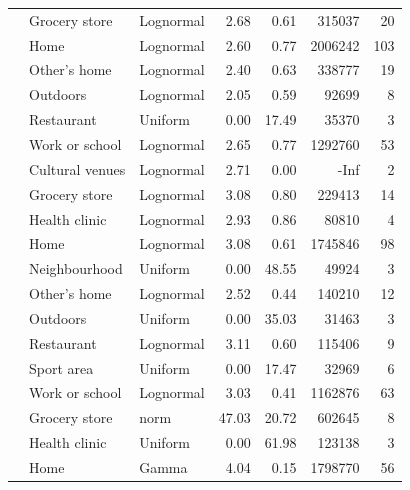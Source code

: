 \documentclass[preprint, 3p,
authoryear]{elsarticle} %
\begin{document}
\begin{table}
{\begin{threeparttable}
\begin{tabular}[t]{rllrrrr}
 & Grocery store & Lognormal & 2.68 & 0.61 & 315037 & 20\\

 & Home & Lognormal & 2.60 & 0.77 & 2006242 & 103\\

 & Other's home & Lognormal & 2.40 & 0.63 & 338777 & 19\\

 & Outdoors & Lognormal & 2.05 & 0.59 & 92699 & 8\\

 & Restaurant & Uniform & 0.00 & 17.49 & 35370 & 3\\

\multirow[t]{-7}{*}{\raggedleft\arraybackslash 2010} & Work or school & Lognormal & 2.65 & 0.77 & 1292760 & 53\\
\cmidrule{1-7}
 & Cultural venues & Lognormal & 2.71 & 0.00 & -Inf & 2\\

 & Grocery store & Lognormal & 3.08 & 0.80 & 229413 & 14\\

 & Health clinic & Lognormal & 2.93 & 0.86 & 80810 & 4\\

 & Home & Lognormal & 3.08 & 0.61 & 1745846 & 98\\

 & Neighbourhood & Uniform & 0.00 & 48.55 & 49924 & 3\\

 & Other's home & Lognormal & 2.52 & 0.44 & 140210 & 12\\

 & Outdoors & Uniform & 0.00 & 35.03 & 31463 & 3\\

 & Restaurant & Lognormal & 3.11 & 0.60 & 115406 & 9\\

 & Sport area & Uniform & 0.00 & 17.47 & 32969 & 6\\

\multirow[t]{-10}{*}{\raggedleft\arraybackslash 2015} & Work or school & Lognormal & 3.03 & 0.41 & 1162876 & 63\\
\cmidrule{1-7}
 & Grocery store & norm & 47.03 & 20.72 & 602645 & 8\\

 & Health clinic & Uniform & 0.00 & 61.98 & 123138 & 3\\

 & Home & Gamma & 4.04 & 0.15 & 1798770 & 56\\


\end{tabular}
\end{threeparttable}}
\end{table}
\end{document}
